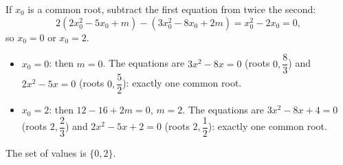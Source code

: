 If $x_0$ is a common root, subtract the first equation from twice the second:
\[
2(2x_0^2-5x_0+m)-(3x_0^2-8x_0+2m)=x_0^2-2x_0=0,
\]
so $x_0=0$ or $x_0=2$.
\begin{itemize}
\item $x_0=0$: then $m=0$. The equations are $3x^2-8x=0$ (roots $0,\dfrac{8}{3}$) and $2x^2-5x=0$ (roots $0,\dfrac{5}{2}$): exactly one common root.
\item $x_0=2$: then $12-16+2m=0$, $m=2$. The equations are $3x^2-8x+4=0$ (roots $2,\dfrac{2}{3}$) and $2x^2-5x+2=0$ (roots $2,\dfrac{1}{2}$): exactly one common root.
\end{itemize}
The set of values is $\boxed{\{0,2\}}$.
